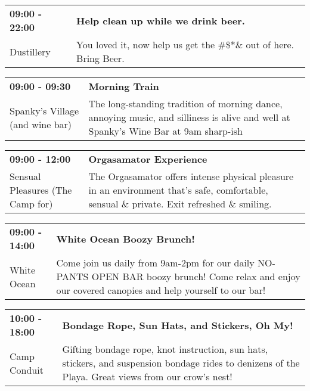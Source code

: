 \begin{tabular}{ p{1in} p{2.2in} }
    \textbf{09:00 - 22:00} & \textbf{Help clean up while we drink beer.} \\
    Dustillery \newline  & You loved it, now help us get the \#\$*\& out of here. Bring Beer. \\
    \hline 
\end{tabular}
    
\begin{tabular}{ p{1in} p{2.2in} }
    \textbf{09:00 - 09:30} & \textbf{Morning Train} \\
    Spanky's Village (and wine bar) \newline  & The long-standing tradition of morning dance, annoying music, and silliness is alive and well at Spanky's Wine Bar at 9am sharp-ish \\
    \hline 
\end{tabular}
    
\begin{tabular}{ p{1in} p{2.2in} }
    \textbf{09:00 - 12:00} & \textbf{Orgasamator Experience} \\
    Sensual Pleasures (The Camp for) \newline  & The Orgasamator offers intense physical pleasure in an environment that's safe, comfortable, sensual \& private.  Exit refreshed \& smiling. \\
    \hline 
\end{tabular}
    
\begin{tabular}{ p{1in} p{2.2in} }
    \textbf{09:00 - 14:00} & \textbf{White Ocean Boozy Brunch!} \\
    White Ocean \newline  & Come join us daily from 9am-2pm for our daily NO-PANTS OPEN BAR boozy brunch! Come relax and enjoy our covered canopies and help yourself to our bar! \\
    \hline 
\end{tabular}
    
\begin{tabular}{ p{1in} p{2.2in} }
    \textbf{10:00 - 18:00} & \textbf{Bondage Rope, Sun Hats, and Stickers, Oh My!} \\
    Camp Conduit \newline  & Gifting bondage rope, knot instruction, sun hats, stickers, and suspension bondage rides to denizens of the Playa. Great views from our crow's nest! \\
    \hline 
\end{tabular}
    
